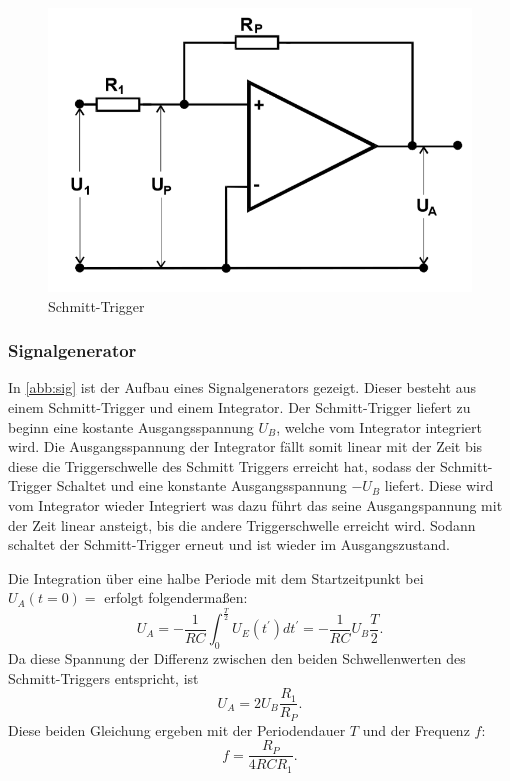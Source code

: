 \begin{figure}[h!]
 	\centering
 	\includegraphics[width=\textwidth]{img/schmitt.png}
 	\caption{Schmitt-Trigger \cite{FP}}
 	\label{abb:sch}
\end{figure}

\subsubsection{Signalgenerator}
In \autoref{abb:sig} ist der Aufbau eines Signalgenerators gezeigt. Dieser besteht aus einem Schmitt-Trigger und einem Integrator. Der Schmitt-Trigger liefert zu beginn eine kostante Ausgangsspannung $U_B$,
welche vom Integrator integriert wird. Die Ausgangsspannung der Integrator fällt somit linear mit der Zeit bis diese die Triggerschwelle des Schmitt Triggers erreicht hat, sodass der Schmitt-Trigger Schaltet und eine konstante Ausgangsspannung $-U_B$ liefert. Diese wird vom Integrator wieder Integriert was dazu führt das seine Ausgangspannung mit der Zeit linear ansteigt, bis die andere Triggerschwelle erreicht wird. Sodann schaltet der Schmitt-Trigger erneut und ist wieder im Ausgangszustand.

Die Integration über eine halbe Periode mit dem Startzeitpunkt bei $U_A(t=0) = $ erfolgt folgendermaßen:
\begin{equation}
U_A = - \frac{1}{RC} \int_{0}^{\frac{T}{2}} U_E(t^\prime)dt^\prime = -\frac{1}{RC} U_B \frac{T}{2} .
\end{equation}
Da diese Spannung der Differenz zwischen den beiden Schwellenwerten des Schmitt-Triggers entspricht, ist
\begin{equation}
U_A = 2U_B\frac{R_1}{R_P} .
\end{equation}
Diese beiden Gleichung ergeben mit der Periodendauer $T$ und der Frequenz $f$:
\begin{equation}
f = \frac{R_P}{4RCR_1} .
\end{equation}

